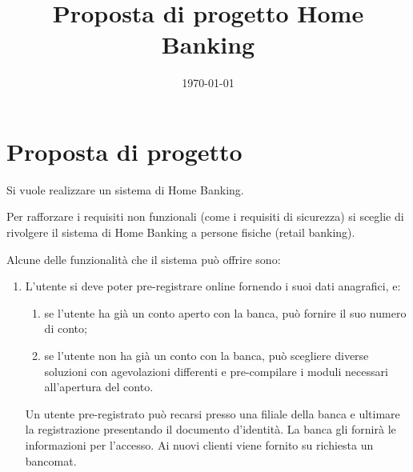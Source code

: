 \documentclass[draft]{softeng}
\title{Proposta di progetto Home Banking}
\date{\today}
\begin{document}
\maketitle

\section{Proposta di progetto} 

Si vuole realizzare un sistema di Home Banking.

Per rafforzare i requisiti non funzionali (come i requisiti di sicurezza) si sceglie di rivolgere il sistema di Home Banking a persone fisiche (retail banking).

Alcune delle funzionalit\`a che il sistema pu\`o offrire sono:
\begin{enumerate}
	\item L'utente si deve poter pre-registrare online fornendo i suoi dati anagrafici, e:
		\begin{enumerate}
			\item se l'utente ha gi\`a un conto aperto con la banca, pu\`o fornire il suo numero di conto;
			\item se l'utente non ha gi\`a un conto con la banca, pu\`o scegliere diverse soluzioni con agevolazioni differenti e pre-compilare i moduli necessari all'apertura del conto.
		\end{enumerate}
		Un utente pre-registrato pu\`o recarsi presso una filiale della banca e ultimare la registrazione presentando il documento d'identit\`a.
		La banca gli fornir\`a le informazioni per l'accesso.
		Ai nuovi clienti viene fornito su richiesta un bancomat.


\end{enumerate}
\end{document}
